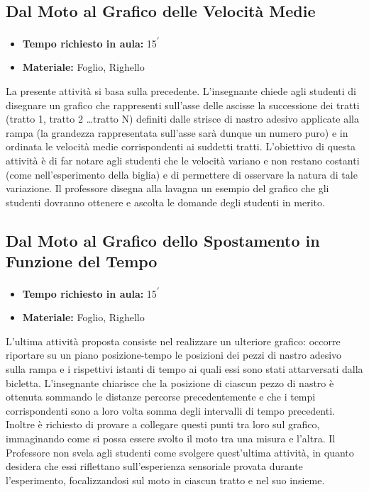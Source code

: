 \documentclass{report} \usepackage[T1]{fontenc} \usepackage[italian]{babel}
\begin{document}
\subsection{Dal Moto al Grafico delle Velocità Medie}
\begin{itemize}
\item \textbf{Tempo richiesto in aula:} 15\textsuperscript{$\prime$}
\item \textbf{Materiale:} Foglio, Righello
\end{itemize}

La presente attività si basa sulla precedente.
L’insegnante chiede agli studenti di disegnare un grafico che rappresenti sull'asse
delle ascisse
la successione dei tratti (tratto 1, tratto 2 \dots tratto N) definiti
dalle strisce di nastro adesivo applicate alla rampa
(la grandezza rappresentata sull'asse sarà dunque un numero puro) e
in ordinata le velocità medie corrispondenti ai suddetti tratti. L'obiettivo
di questa attività è di far notare agli studenti che le velocità variano e non
restano costanti (come nell'esperimento della biglia) e di permettere di osservare
la natura di tale variazione.
Il professore disegna alla lavagna un esempio del grafico che gli studenti
dovranno ottenere e ascolta le domande degli studenti in merito.

\subsection{Dal Moto al Grafico dello Spostamento in Funzione del Tempo}

\begin{itemize}
\item \textbf{Tempo richiesto in aula:} 15\textsuperscript{$\prime$}
\item \textbf{Materiale:} Foglio, Righello
\end{itemize}

L’ultima attività proposta consiste nel realizzare un ulteriore grafico:
occorre riportare su un piano posizione-tempo le
posizioni dei pezzi di nastro adesivo sulla rampa e i rispettivi istanti di
tempo ai quali essi sono stati attarversati dalla bicletta. L’insegnante
chiarisce che la posizione di ciascun pezzo di nastro è
ottenuta sommando le distanze percorse precedentemente e che i tempi
corrispondenti sono a loro volta somma degli intervalli di tempo precedenti.
Inoltre è richiesto di provare a collegare questi punti tra loro sul grafico,
immaginando come si possa essere svolto il moto tra una misura e l'altra.
Il Professore non svela agli studenti come svolgere quest’ultima
attività, in quanto desidera che essi riflettano sull'esperienza sensoriale
provata durante l’esperimento, focalizzandosi sul moto in ciascun
tratto e nel suo insieme.
\end{document}
